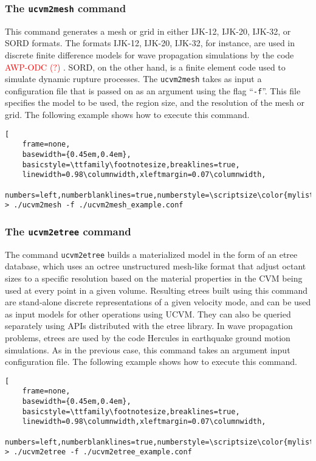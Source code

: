 \subsubsection{The \textup{\texttt{ucvm2mesh}} command}

This command generates a mesh or grid in either IJK-12, IJK-20, IJK-32, or SORD formats. The formats IJK-12, IJK-20, IJK-32, for instance, are used in discrete finite difference models for wave propagation simulations by the code \textcolor{red}{AWP-ODC (?) \citep{Cui_2010_Proc}}. SORD, on the other hand, is a finite element code used to simulate dynamic rupture processes. The \texttt{ucvm2mesh} takes as input a configuration file that is passed on as an argument using the flag ``\texttt{-f}''. This file specifies the model to be used, the region size, and the resolution of the mesh or grid. The following example shows how to execute this command.

\begin{lstlisting}[
	frame=none,
	basewidth={0.45em,0.4em},
	basicstyle=\ttfamily\footnotesize,breaklines=true,
	linewidth=0.98\columnwidth,xleftmargin=0.07\columnwidth,
	numbers=left,numberblanklines=true,numberstyle=\scriptsize\color{mylistingnclr}]
> ./ucvm2mesh -f ./ucvm2mesh_example.conf
\end{lstlisting}

\subsubsection{The \textup{\texttt{ucvm2etree}} command}

The command \texttt{ucvm2etree} builds a materialized model in the form of an etree database, which uses an octree unstructured mesh-like format that adjust octant sizes to a specific resolution based on the material properties in the CVM being used at every point in a given volume. Resulting etrees built using this command are stand-alone discrete representations of a given velocity mode, and can be used as input models for other operations using UCVM. They can also be queried separately using APIs distributed with the etree library. In wave propagation problems, etrees are used by the code Hercules \citep{Tu_2006_SC, Taborda_2010_Tech} in earthquake ground motion simulations. As in the previous case, this command takes an argument input configuration file. The following example shows how to execute this command.

\begin{lstlisting}[
	frame=none,
	basewidth={0.45em,0.4em},
	basicstyle=\ttfamily\footnotesize,breaklines=true,
	linewidth=0.98\columnwidth,xleftmargin=0.07\columnwidth,
	numbers=left,numberblanklines=true,numberstyle=\scriptsize\color{mylistingnclr}]
> ./ucvm2etree -f ./ucvm2etree_example.conf
\end{lstlisting}

